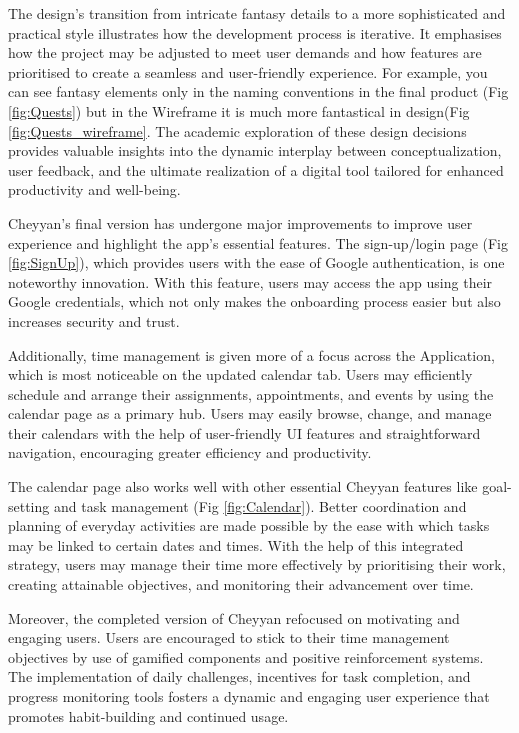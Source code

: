 \documentclass{l4proj}
\begin{document}
The design's transition from intricate fantasy details to a more sophisticated and practical style illustrates how the development process is iterative. It emphasises how the project may be adjusted to meet user demands and how features are prioritised to create a seamless and user-friendly experience. For example, you can see fantasy elements only in the naming conventions in the final product (Fig \ref{fig:Quests}) but in the Wireframe it is much more fantastical in design(Fig \ref{fig:Quests_wireframe}.  The academic exploration of these design decisions provides valuable insights into the dynamic interplay between conceptualization, user feedback, and the ultimate realization of a digital tool tailored for enhanced productivity and well-being.

Cheyyan's final version has undergone major improvements to improve user experience and highlight the app's essential features. The sign-up/login page (Fig \ref{fig:SignUp}), which provides users with the ease of Google authentication, is one noteworthy innovation. With this feature, users may access the app using their Google credentials, which not only makes the onboarding process easier but also increases security and trust.

Additionally, time management is given more of a focus across the Application, which is most noticeable on the updated calendar tab. Users may efficiently schedule and arrange their assignments, appointments, and events by using the calendar page as a primary hub. Users may easily browse, change, and manage their calendars with the help of user-friendly UI features and straightforward navigation, encouraging greater efficiency and productivity.

The calendar page also works well with other essential Cheyyan features like goal-setting and task management (Fig \ref{fig:Calendar}). Better coordination and planning of everyday activities are made possible by the ease with which tasks may be linked to certain dates and times. With the help of this integrated strategy, users may manage their time more effectively by prioritising their work, creating attainable objectives, and monitoring their advancement over time.

Moreover, the completed version of Cheyyan refocused on motivating and engaging users. Users are encouraged to stick to their time management objectives by use of gamified components and positive reinforcement systems. The implementation of daily challenges, incentives for task completion, and progress monitoring tools fosters a dynamic and engaging user experience that promotes habit-building and continued usage.
\end{document}

